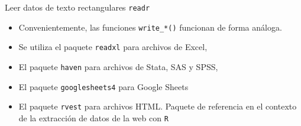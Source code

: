 \documentclass[
  ignorenonframetext,
  aspectratio=169]{beamer}
\begin{document}
\begin{frame}[fragile]{Leer datos de texto rectangulares \texttt{readr}}
\protect\hypertarget{leer-datos-de-texto-rectangulares-readr-1}{}
\begin{itemize}
\item
  Convenientemente, las funciones \texttt{write\_*()} funcionan de forma
  análoga.
\item
  Se utiliza el paquete \texttt{readxl} para archivos de Excel,
\item
  El paquete \texttt{haven} para archivos de Stata, SAS y SPSS,
\item
  El paquete \texttt{googlesheets4} para Google Sheets
\item
  El paquete \texttt{rvest} para archivos HTML. Paquete de referencia en
  el contexto de la extracción de datos de la web con \texttt{R}
\end{itemize}
\end{frame}
\end{document}
